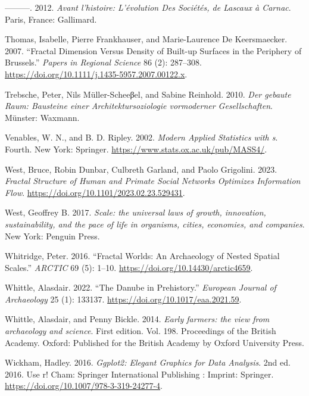 \documentclass[
  12pt,
  a4paper, twoside]{book}
\newlength{\cslhangindent}
\newlength{\cslentryspacingunit} %
\newenvironment{CSLReferences}[2] %
 {%
  \setlength{\parindent}{0pt}
  \ifodd #1
  \let\oldpar\par
  \def\par{\hangindent=\cslhangindent\oldpar}
  \fi
  \setlength{\parskip}{#2\cslentryspacingunit}
 }%
 {}
\begin{document}
\begin{CSLReferences}{1}{0}
\leavevmode{}%
---------. 2012. \emph{Avant l'histoire: L'évolution Des Sociétés, de Lascaux à Carnac}. Paris, France: Gallimard.

\leavevmode{}%
Thomas, Isabelle, Pierre Frankhauser, and Marie-Laurence De Keersmaecker. 2007. {``Fractal Dimension Versus Density of Built-up Surfaces in the Periphery of Brussels.''} \emph{Papers in Regional Science} 86 (2): 287--308. \url{https://doi.org/10.1111/j.1435-5957.2007.00122.x}.

\leavevmode{}%
Trebsche, Peter, Nils Müller-Scheeβel, and Sabine Reinhold. 2010. \emph{Der gebaute Raum: Bausteine einer Architektursoziologie vormoderner Gesellschaften}. Münster: Waxmann.

\leavevmode{}%
Venables, W. N., and B. D. Ripley. 2002. \emph{Modern Applied Statistics with s}. Fourth. New York: Springer. \url{https://www.stats.ox.ac.uk/pub/MASS4/}.

\leavevmode{}%
West, Bruce, Robin Dunbar, Culbreth Garland, and Paolo Grigolini. 2023. \emph{Fractal Structure of Human and Primate Social Networks Optimizes Information Flow}. \url{https://doi.org/10.1101/2023.02.23.529431}.

\leavevmode{}%
West, Geoffrey B. 2017. \emph{Scale: the universal laws of growth, innovation, sustainability, and the pace of life in organisms, cities, economies, and companies}. New York: Penguin Press.

\leavevmode{}%
Whitridge, Peter. 2016. {``Fractal Worlds: An Archaeology of Nested Spatial Scales.''} \emph{ARCTIC} 69 (5): 1--10. \url{https://doi.org/10.14430/arctic4659}.

\leavevmode{}%
Whittle, Alasdair. 2022. {``The Danube in Prehistory.''} \emph{European Journal of Archaeology} 25 (1): 133137. \url{https://doi.org/10.1017/eaa.2021.59}.

\leavevmode{}%
Whittle, Alasdair, and Penny Bickle. 2014. \emph{Early farmers: the view from archaeology and science}. First edition. Vol. 198. Proceedings of the British Academy. Oxford: Published for the British Academy by Oxford University Press.

\leavevmode{}%
Wickham, Hadley. 2016. \emph{Ggplot2: Elegant Graphics for Data Analysis}. 2nd ed. 2016. Use r! Cham: Springer International Publishing : Imprint: Springer. \url{https://doi.org/10.1007/978-3-319-24277-4}.


\end{CSLReferences}
\end{document}
